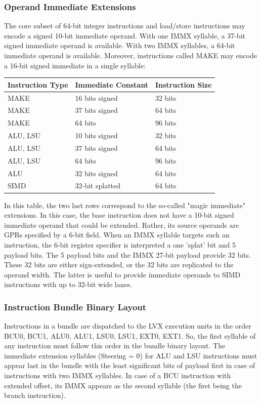 \subsubsection{Operand Immediate Extensions}

The core subset of 64-bit integer instructions and load/store instructions may encode a signed 10-bit immediate operand. With one IMMX syllable, a 37-bit signed immediate operand is available. With two IMMX syllables, a 64-bit immediate operand is available. Moreover, instructions called MAKE may encode a 16-bit signed immediate in a single syllable:

\begin{center}
\begin{tabular}{|l|l|l|} \hline
Instruction Type & Immediate Constant & Instruction Size \\ \hline
MAKE & 16 bits signed & 32 bits \\
MAKE & 37 bits signed & 64 bits \\
MAKE & 64 bits & 96 bits \\
ALU, LSU & 10 bits signed & 32 bits \\
ALU, LSU & 37 bits signed & 64 bits \\
ALU, LSU & 64 bits & 96 bits \\ \hline
ALU & 32 bits signed & 64 bits \\
SIMD & 32-bit splatted & 64 bits \\
\hline \end{tabular}
\end{center}

In this table, the two last rows correspond to the so-called "magic immediate" extensions. In this case, the base instruction does not have a 10-bit signed immediate operand that could be extended. Rather, its source operands are GPRs specified by a 6-bit field. When an IMMX syllable targets such an instruction, the 6-bit register specifier is interpreted a one 'splat' bit and 5 payload bits. The 5 payload bits and the IMMX 27-bit payload provide 32 bits. These 32 bits are either sign-extended, or the 32 bits are replicated to the operand width. The latter is useful to provide immediate operands to SIMD instructions with up to 32-bit wide lanes.

\subsubsection{Instruction Bundle Binary Layout}

Instructions in a bundle are dispatched to the LVX execution units in the order BCU0, BCU1, ALU0, ALU1, LSU0, LSU1, EXT0, EXT1. So, the first syllable of any instruction must follow this order in the bundle binary layout. The immediate extension syllables (Steering = 0) for ALU and LSU instructions must appear last in the bundle with the least significant bits of payload first in case of instructions with two IMMX syllables. In case of a BCU instruction with extended offset, its IMMX appears as the second syllable (the first being the branch instruction).

